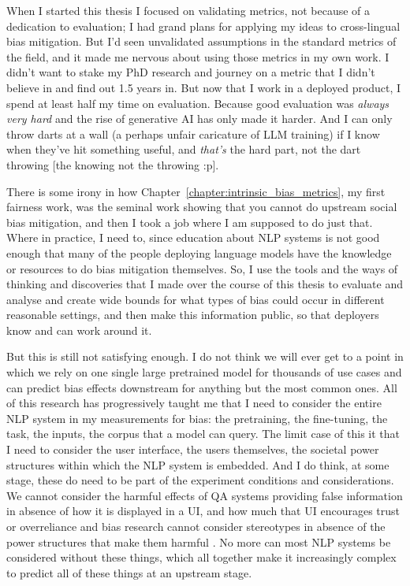 When I started this thesis I focused on validating metrics, not because of a dedication to evaluation; I had grand plans for applying my ideas to cross-lingual bias mitigation. But I'd seen unvalidated assumptions in the standard metrics of the field, and it made me nervous about using those metrics in my own work. I didn't want to stake my PhD research and journey on a metric that I didn't believe in and find out 1.5 years in. But now that I work in a deployed product, I spend at least half my time on evaluation. Because good evaluation was \textit{always very hard} and the rise of generative AI has only made it harder. And I can only throw darts at a wall (a perhaps unfair caricature of LLM training) if I know when they've hit something useful, and \textit{that's} the hard part, not the dart throwing [the knowing not the throwing :p]. 

There is some irony in how Chapter~\ref{chapter:intrinsic_bias_metrics}, my first fairness work, was the seminal work showing that you cannot do upstream social bias mitigation, and then I took a job where I am supposed to do just that. Where in practice, I need to, since education about NLP systems is not good enough that many of the people deploying language models have the knowledge or resources to do bias mitigation themselves. So, I use the tools and the ways of thinking and discoveries that I made over the course of this thesis to evaluate and analyse and create wide bounds for what types of bias could occur in different reasonable settings, and then make this information public, so that deployers know and can work around it. 

But this is still not satisfying enough. I do not think we will ever get to a point in which we rely on one single large pretrained model for thousands of use cases and can predict bias effects downstream for anything but the most common ones. All of this research has progressively taught me that I need to consider the entire NLP system in my measurements for bias: the pretraining, the fine-tuning, the task, the inputs, the corpus that a model can query. The limit case of this it that I need to consider the user interface, the users themselves, the societal power structures within which the NLP system is embedded. And I do think, at some stage, these do need to be part of the experiment conditions and considerations. We cannot consider the harmful effects of QA systems providing false information in absence of how it is displayed in a UI, and how much that UI encourages trust or overreliance \citep{bucinca_2021} and bias research cannot consider stereotypes in absence of the power structures that make them harmful \citep{blodgett-etal-2021-stereotyping}. No more can most NLP systems be considered without these things, which all together make it increasingly complex to predict all of these things at an upstream stage. 

